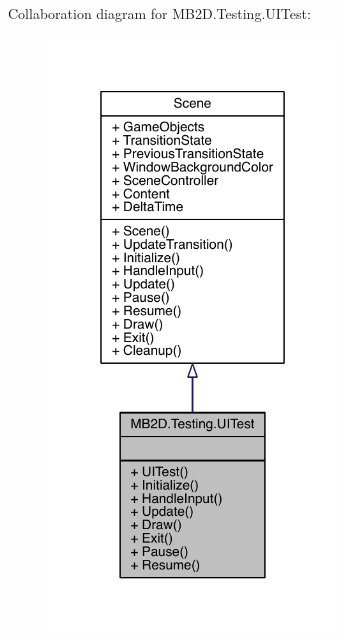 Collaboration diagram for M\+B2\+D.\+Testing.\+U\+I\+Test\+:
\nopagebreak
\begin{figure}[H]
\begin{center}
\leavevmode
\includegraphics[width=217pt]{class_m_b2_d_1_1_testing_1_1_u_i_test__coll__graph}
\end{center}
\end{figure}
